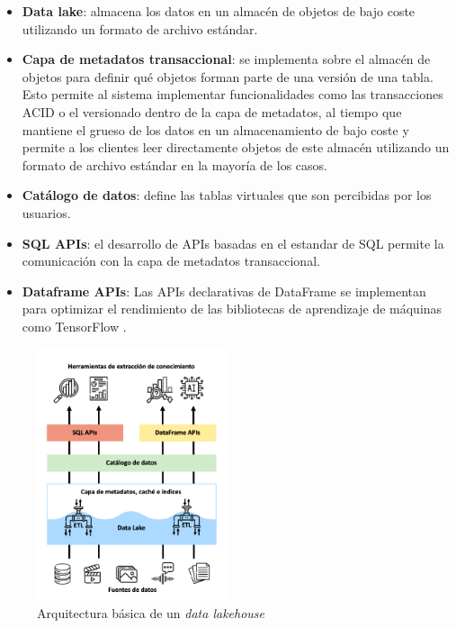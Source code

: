 \begin{itemize}
    \item \textbf{Data lake}: almacena los datos en un almacén de objetos de bajo coste utilizando un formato de archivo estándar.
    \item \textbf{Capa de metadatos transaccional}: se implementa sobre el almacén de objetos para definir qué objetos forman parte de una versión de una tabla. 
    Esto permite al sistema implementar funcionalidades como las transacciones ACID o el versionado dentro de la capa de metadatos, 
    al tiempo que mantiene el grueso de los datos en un almacenamiento de bajo coste y permite a los clientes leer directamente objetos de este almacén utilizando un formato de archivo estándar en la mayoría de los casos.
    \item \textbf{Catálogo de datos}: define las tablas virtuales que son percibidas por los usuarios.
    \item \textbf{SQL APIs}: el desarrollo de APIs basadas en el estandar de SQL permite la comunicación con la capa de metadatos transaccional.
    \item \textbf{Dataframe APIs}: Las APIs declarativas de DataFrame se implementan  
    para optimizar el rendimiento de las bibliotecas de aprendizaje de máquinas como TensorFlow \cite{tensorflow2015-whitepaper}.
\end{itemize}

\begin{figure}[h!]
    \centering
    \includegraphics[width=0.5\textwidth]{Images/dlh-architecture.png}
    \caption{Arquitectura básica de un \textit{data lakehouse}}
    \label{fig:dlh-architecture}
\end{figure}




